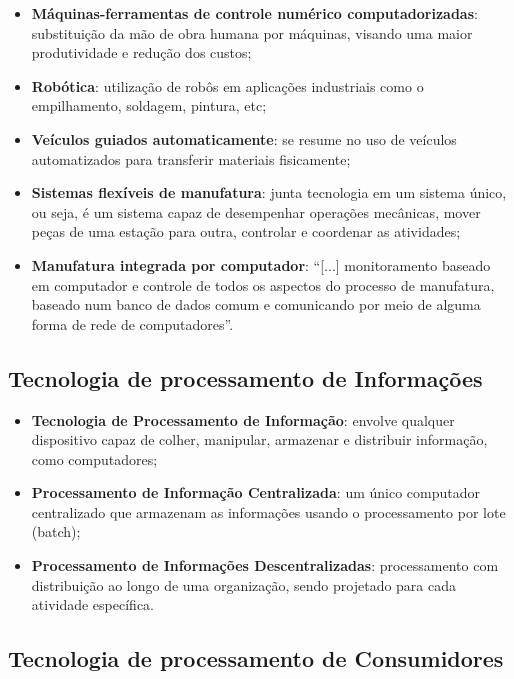 			\begin{itemize}
				\item{\textbf{Máquinas-ferramentas de controle numérico computadorizadas}: substituição da mão de obra humana por máquinas, visando uma maior produtividade e redução dos custos;}
				\item{\textbf{Robótica}: utilização de robôs em aplicações industriais como o empilhamento, soldagem, pintura, etc;}
				\item{\textbf{Veículos guiados automaticamente}: se resume no uso de veículos automatizados para transferir materiais fisicamente;}
				\item{\textbf{Sistemas flexíveis de manufatura}: junta tecnologia em um sistema único, ou seja, é um sistema capaz de desempenhar operações mecânicas, mover peças de uma estação para outra, controlar e coordenar as atividades;}
				\item{\textbf{Manufatura integrada por computador}: “[...] monitoramento baseado em computador e controle de todos os aspectos do processo de manufatura, baseado num banco de dados comum e comunicando por meio de alguma forma de rede de computadores”. \cite{dale}}
			\end{itemize}

		\subsection[Tecnologia de processamento de Informações]{Tecnologia de processamento de Informações}
		\label{sec:tecnologias_definicao_informacoes}
		
			\begin{itemize}
				\item{\textbf{Tecnologia de Processamento de Informação}: envolve qualquer dispositivo capaz de colher, manipular, armazenar e distribuir informação, como computadores;}
				\item{\textbf{Processamento de Informação Centralizada}: um único computador centralizado que armazenam as informações usando o processamento por lote (batch);}
				\item{\textbf{Processamento de Informações Descentralizadas}: processamento com distribuição ao longo de uma organização, sendo projetado para cada atividade específica.}
			\end{itemize}

		\subsection[Tecnologia de processamento de Consumidores]{Tecnologia de processamento de Consumidores}
		\label{sec:tecnologias_definicao_consumidores}

